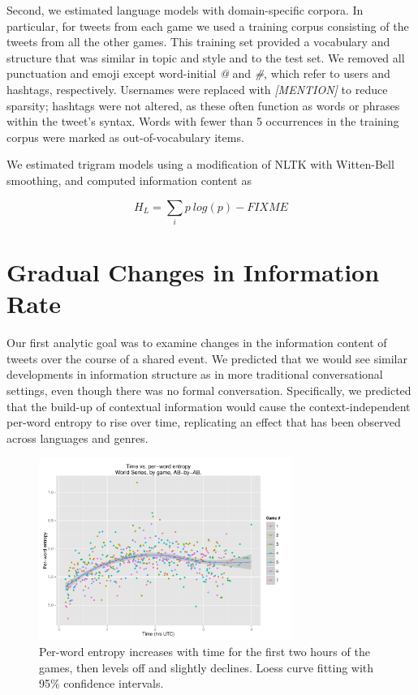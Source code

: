 \documentclass[11pt,letterpaper]{article}
\begin{document}
Second, we estimated language models with domain-specific corpora. In particular, for tweets from each game we used a training corpus consisting of the tweets from all the other games. This training set provided a vocabulary and structure that was similar in topic and style and to the test set.  We removed all punctuation and emoji except word-initial {\it @} and {\it \#}, which refer to users and hashtags, respectively.  Usernames were replaced with {\it [MENTION]} to reduce sparsity; hashtags were not altered, as these often function as words or phrases within the tweet's syntax.  Words with fewer than 5 occurrences in the training corpus were marked as out-of-vocabulary items.

We estimated trigram models using a modification of NLTK \cite{bird2006} with Witten-Bell smoothing, and computed information content as

\begin{equation}
H_L = \sum_i{p ~ log(p)} - FIXME
\end{equation}

\section{Gradual Changes in Information Rate}

Our first analytic goal was to examine changes in the information content of tweets over the course of a shared event.  We predicted that we would see similar developments in information structure as in more traditional conversational settings, even though there was no formal conversation.  Specifically, we predicted that the build-up of contextual information would cause the context-independent per-word entropy to rise over time, replicating an effect that has been observed across languages and genres\cite{genzel2002,genzel2003,qian2012}.

\begin{figure}
 \centering
  \includegraphics[width=3.25in]{figures/time-perword-ent-agg}
 \caption{Per-word entropy increases with time for the first two hours of the games, then levels off and slightly declines. Loess curve fitting with 95\% confidence intervals.}\label{fig:time-perword-ent}\vspace*{-.5em}
\end{figure}
\end{document}

